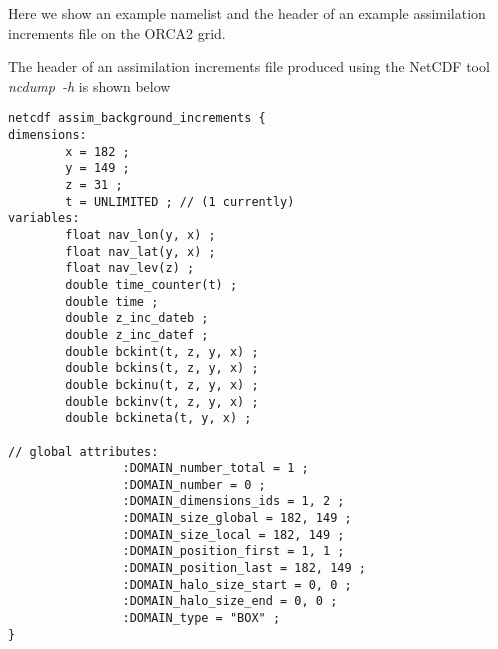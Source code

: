 Here we show an example  namelist and the header of an example assimilation 
increments file on the ORCA2 grid.


The header of an assimilation increments file produced using the NetCDF tool
\mbox{\textit{ncdump~-h}} is shown below

\begin{alltt}
\tiny
\begin{verbatim}
netcdf assim_background_increments {
dimensions:
        x = 182 ;
        y = 149 ;
        z = 31 ;
        t = UNLIMITED ; // (1 currently)
variables:
        float nav_lon(y, x) ;
        float nav_lat(y, x) ;
        float nav_lev(z) ;
        double time_counter(t) ;
        double time ;
        double z_inc_dateb ;
        double z_inc_datef ;
        double bckint(t, z, y, x) ;
        double bckins(t, z, y, x) ;
        double bckinu(t, z, y, x) ;
        double bckinv(t, z, y, x) ;
        double bckineta(t, y, x) ;

// global attributes:
                :DOMAIN_number_total = 1 ;
                :DOMAIN_number = 0 ;
                :DOMAIN_dimensions_ids = 1, 2 ;
                :DOMAIN_size_global = 182, 149 ;
                :DOMAIN_size_local = 182, 149 ;
                :DOMAIN_position_first = 1, 1 ;
                :DOMAIN_position_last = 182, 149 ;
                :DOMAIN_halo_size_start = 0, 0 ;
                :DOMAIN_halo_size_end = 0, 0 ;
                :DOMAIN_type = "BOX" ;
}
\end{verbatim}
\end{alltt}
